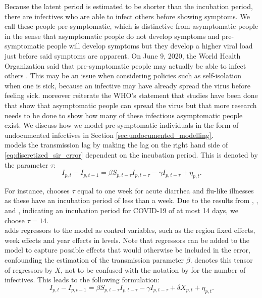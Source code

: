 \documentclass[12pt]{article}
\begin{document}
	Because the latent period is estimated to be shorter than the incubation period, there are infectives who are able to infect others before showing symptoms. We call these people pre-symptomatic, which is distinctive from asymptomatic people in the sense that asymptomatic people do not develop symptoms and pre-symptomatic people will develop symptoms but they develop a higher viral load just before said symptoms are apparent. On June 9, 2020, the World Health Organization said that pre-symptomatic people may actually be able to infect others \parencite{bloomberg2020AsymptomaticSpread}. This may be an issue when considering policies such as self-isolation when one is sick, because an infective may have already spread the virus before feeling sick. \textcite{bloomberg2020AsymptomaticSpread} moreover reiterate the WHO's statement that studies have been done that show that asymptomatic people can spread the virus but that more research needs to be done to show how many of these infectious asymptomatic people exist. We discuss how we model pre-symptomatic individuals in the form of undocumented infectives in Section \ref{sec:undocumented_modelling}. \\
	
	\textcite{adda2016economic} models the transmission lag by making the lag on the right hand side of \eqref{eq:discretized_sir_error} dependent on the incubation period. This is denoted by the parameter $\tau$:
	    \begin{equation}\label{eq:discretized_sir_tau}
	        I_{p,t} - I_{p,t-1} = \beta S_{p,t-\tau}I_{p,t-\tau} - \gamma I_{p,t-\tau} + \eta_{p,t}.
	    \end{equation}
	
	For instance, \textcite{adda2016economic} chooses $\tau$ equal to one week for acute diarrhea and flu-like illnesses as these have an incubation period of less than a week. Due to the results from \textcite{lauer2020incubation}, \textcite{li2020incubation}, and \textcite{linton2020incubation}, indicating an incubation period for COVID-19 of at most 14 days, we choose $\tau = 14$. \\
	
	\textcite{adda2016economic} adds regressors to the model as control variables, such as the region fixed effects, week effects and year effects in levels. Note that regressors can be added to the model to capture possible effects that would otherwise be included in the error, confounding the estimation of the transmission parameter $\beta$. \textcite{adda2016economic} denotes this tensor of regressors by $X$, not to be confused with the notation by \textcite{keeling2011modeling} for the number of infectives. This leads to the following formulation:
	    \begin{equation}\label{eq:discretized_sir_regressors}
        	I_{p,t} - I_{p,t-1} = \beta S_{p,t-\tau}I_{p,t-\tau} - \gamma I_{p,t-\tau} + \delta X_{p,t} + \eta_{p,t}.
    	\end{equation}
    	
\end{document}
